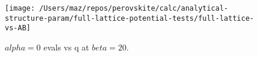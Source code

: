 \documentclass[a4paper,prb]{revtex4-1}  %
\newcommand{\com}[1]{}
\begin{document}
\com{
Since the qualitative picture stays the same
in FL case,
we can 
think of the effect of the rest of the ions in the lattice
still in terms of the AB cages by renormalising $q_A$.
}




\begin{figure}[htbp]
\begin{center}
\texttt{[image: /Users/maz/repos/perovskite/calc/analytical-structure-param/full-lattice-potential-tests/full-lattice-vs-AB]}
\caption{$alpha=0$ evals vs q at $beta=20$. 
}
\label{fig:t2g-lattice}
\end{center}
\end{figure}
\end{document}
